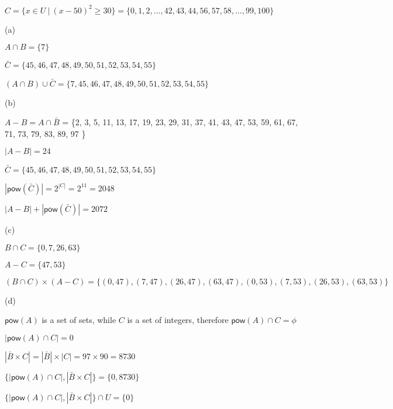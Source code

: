 \documentclass[11pt,twoside]{article}
\begin{document}
$C = \{x \in U\ |\ (x-50)^2 \geq 30\} = \{0,1,2,\dots,42,43,44,56,57,58,\dots,99,100 \}$

\hspace*{\fill}

(a) 

$A \cap B = \{7\}$

$\bar{C} = \{45,46,47,48,49,50,51,52,53,54,55\}$

$(A \cap B) \cup \bar{C} = \{7,45,46,47,48,49,50,51,52,53,54,55\}$

\hspace*{\fill}

(b)


$A-B = A\cap \bar{B}$
= \{2, 3, 5, 11, 13, 17, 19, 23, 29, 31, 37, 41, 43, 47, 53, 59, 61, 67, 71, 73, 79, 83, 89, 97 \}  

$|A-B| = 24$

$\bar{C} = \{45,46,47,48,49,50,51,52,53,54,55\}$

$|\mathsf{pow}(\bar{C})| = 2^{|C|} = 2^{11} = 2048$

$|A-B|+|\mathsf{pow}(\bar{C})| = 2072$


\hspace*{\fill}


(c)

$B \cap C = \{0, 7, 26, 63 \}$

$A-C=\{47, 53 \}$

$(B \cap C) \times (A-C) = \{(0,47),(7,47),(26,47),(63,47),(0,53),(7,53),(26,53),(63,53) \}$

\hspace*{\fill}

(d)

$\mathsf{pow}(A)$ is a set of sets, while $C$ is a set of integers, therefore $\mathsf{pow}(A) \cap C = \phi$

$|\mathsf{pow}(A) \cap C| = 0$

$|\bar{B} \times C|= |\bar{B}| \times |C| = 97 \times 90 = 8730$

$\{|\mathsf{pow}(A) \cap C|, |\bar{B} \times C|\}=\{0,8730\}$

$\{|\mathsf{pow}(A) \cap C|, |\bar{B} \times C|\} \cap U =\{0\}$
\end{document}
